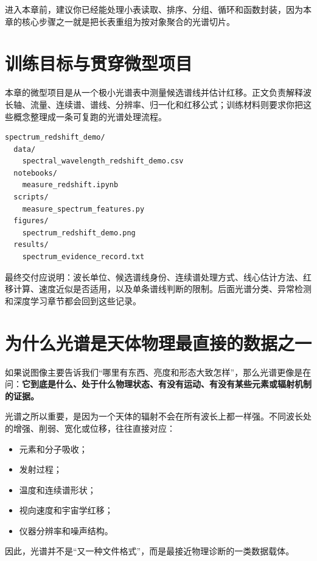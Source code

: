 进入本章前，建议你已经能处理小表读取、排序、分组、循环和函数封装，因为本章的核心步骤之一就是把长表重组为按对象聚合的光谱切片。

\section{训练目标与贯穿微型项目}

本章的微型项目是从一个极小光谱表中测量候选谱线并估计红移。正文负责解释波长轴、流量、连续谱、谱线、分辨率、归一化和红移公式；训练材料则要求你把这些概念整理成一条可复跑的光谱处理流程。

\begin{examplebox}[最小光谱项目结构]
\begin{lstlisting}[style=terminal]
spectrum_redshift_demo/
  data/
    spectral_wavelength_redshift_demo.csv
  notebooks/
    measure_redshift.ipynb
  scripts/
    measure_spectrum_features.py
  figures/
    spectrum_redshift_demo.png
  results/
    spectrum_evidence_record.txt
\end{lstlisting}
\end{examplebox}

最终交付应说明：波长单位、候选谱线身份、连续谱处理方式、线心估计方法、红移计算、速度近似是否适用，以及单条谱线判断的限制。后面光谱分类、异常检测和深度学习章节都会回到这些记录。

\section{为什么光谱是天体物理最直接的数据之一}

如果说图像主要告诉我们“哪里有东西、亮度和形态大致怎样”，那么光谱更像是在问：\textbf{它到底是什么、处于什么物理状态、有没有运动、有没有某些元素或辐射机制的证据。}

光谱之所以重要，是因为一个天体的辐射不会在所有波长上都一样强。不同波长处的增强、削弱、宽化或位移，往往直接对应：

\begin{itemize}
    \item 元素和分子吸收；
    \item 发射过程；
    \item 温度和连续谱形状；
    \item 视向速度和宇宙学红移；
    \item 仪器分辨率和噪声结构。
\end{itemize}

因此，光谱并不是“又一种文件格式”，而是最接近物理诊断的一类数据载体。


